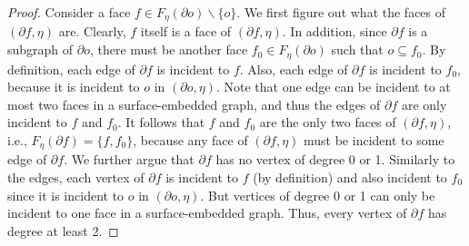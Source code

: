 \documentclass[a4paper,11pt]{article}
\numberwithin{lemma}{section}
\begin{document}
\begin{proof}
Consider a face $f \in F_\eta(\partial o) \backslash \{o\}$.
We first figure out what the faces of $(\partial f,\eta)$ are.
Clearly, $f$ itself is a face of $(\partial f,\eta)$.
In addition, since $\partial f$ is a subgraph of $\partial o$, there must be another face $f_0 \in F_\eta(\partial o)$ such that $o \subseteq f_0$.
By definition, each edge of $\partial f$ is incident to $f$.
Also, each edge of $\partial f$ is incident to $f_0$, because it is incident to $o$ in $(\partial o,\eta)$.
Note that one edge can be incident to at most two faces in a surface-embedded graph, and thus the edges of $\partial f$ are only incident to $f$ and $f_0$.
It follows that $f$ and $f_0$ are the only two faces of $(\partial f,\eta)$, i.e., $F_\eta(\partial f) = \{f,f_0\}$, because any face of $(\partial f,\eta)$ must be incident to some edge of $\partial f$.
We further argue that $\partial f$ has no vertex of degree 0 or 1.
Similarly to the edges, each vertex of $\partial f$ is incident to $f$ (by definition) and also incident to $f_0$ since it is incident to $o$ in $(\partial o,\eta)$.
But vertices of degree 0 or 1 can only be incident to one face in a surface-embedded graph.
Thus, every vertex of $\partial f$ has degree at least 2.


\end{proof}
\end{document}
